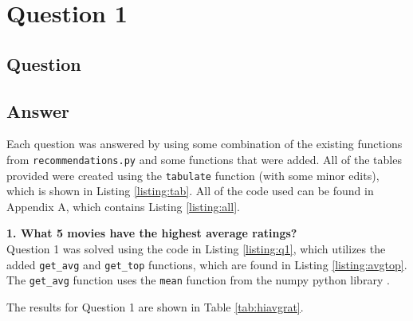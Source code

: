 \section{Question 1}

\subsection{Question}


\subsection{Answer}
Each question was answered by using some combination of the existing functions from {\tt recommendations.py} and some functions that were added. All of the tables provided were created using the {\tt tabulate} function (with some minor edits), which is shown in Listing \ref{listing:tab}. All of the code used can be found in Appendix A, which contains Listing \ref{listing:all}.



\textbf{1. What 5 movies have the highest average ratings?}\\

Question 1 was solved using the code in Listing \ref{listing:q1}, which utilizes the added {\tt get\_avg} and {\tt get\_top} functions, which are found in Listing \ref{listing:avgtop}. The {\tt get\_avg} function uses the {\tt mean} function from the numpy python library \cite{py:numpy}.

\clearpage





The results for Question 1 are shown in Table \ref{tab:hiavgrat}.

